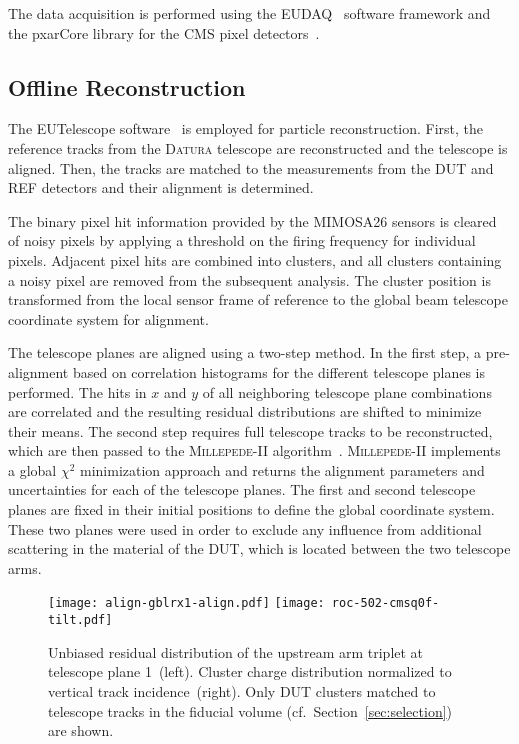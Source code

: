 \documentclass[a4paper,11pt]{article}
\newcommand{\datura}{\textsc{Datura}\xspace}
\begin{document}
The data acquisition is performed using the EUDAQ~\cite{EUDET-2010-01} software framework and the pxarCore library for the CMS pixel detectors~\cite{pxar-manual}.


\subsection{Offline Reconstruction}
\label{sec:reco}

The EUTelescope software~\cite{EUDET-2010-12} is employed for particle reconstruction.
First, the reference tracks from the \datura telescope are reconstructed and the telescope is aligned.
Then, the tracks are matched to the measurements from the DUT and REF detectors and their alignment is determined.

The binary pixel hit information provided by the MIMOSA26 sensors is cleared of noisy pixels by applying a threshold on the firing frequency for individual pixels.
Adjacent pixel hits are combined into clusters, and all clusters containing a noisy pixel are removed from the subsequent analysis.
The cluster position is transformed from the local sensor frame of reference to the global beam telescope coordinate system for alignment.

The telescope planes are aligned using a two-step method.
In the first step, a pre-alignment based on correlation histograms for the different telescope planes is performed.
The hits in $x$ and $y$ of all neighboring telescope plane combinations are correlated and the resulting residual distributions are shifted to minimize their means.
The second step requires full telescope tracks to be reconstructed, which are then passed to the \textsc{Millepede-II} algorithm~\cite{Blobel2011, millepede}.
\textsc{Millepede-II} implements a global $\chi^2$ minimization approach and returns the alignment parameters and uncertainties for each of the telescope planes.
The first and second telescope planes are fixed in their initial positions to define the global coordinate system.
These two planes were used in order to exclude any influence from additional scattering in the material of the DUT, which is located between the two telescope arms.

\begin{figure}[tbp]
  \centering
  \texttt{[image: align-gblrx1-align.pdf]}%
  \texttt{[image: roc-502-cmsq0f-tilt.pdf]}%
  \caption[Normalized cluster charge]{Unbiased residual distribution of the upstream arm triplet at telescope plane 1~(left). Cluster charge distribution normalized to vertical track incidence~(right). Only DUT clusters matched to telescope tracks in the fiducial volume (cf.\ Section~\ref{sec:selection}) are shown.}
  \label{fig:cmsq0f}
\end{figure}
\end{document}
